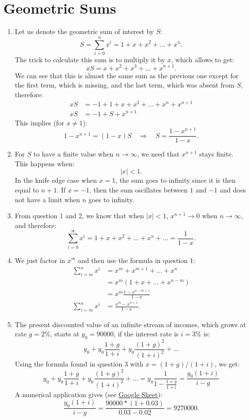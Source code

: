 \documentclass[]{book}
\theoremstyle{definition}
\theoremstyle{definition}
\theoremstyle{definition}
\theoremstyle{remark}
\begin{document}
\section*{Geometric Sums}\label{geometric-sums-1}

\begin{enumerate}
\def\labelenumi{\arabic{enumi}.}
\item
  Let us denote the geometric sum of interest by \(S\):
  \[S=\sum_{i=0}^n x^i = 1+x+x^2+...+x^n.\] The trick to calculate this
  sum is to multiply it by \(x\), which allows to get:
  \[xS=x+x^2+x^3+...+x^{n+1}.\] We can see that this is almost the same
  sum as the previous one except for the first term, which is missing,
  and the last term, which was absent from \(S\), therefore:
  \[\begin{aligned}
  xS&=-1+1+x+x^2+...+x^n+x^{n+1}\\
  xS&=-1+S+x^{n+1}
  \end{aligned}\] This implies (for \(x\neq1\)):
  \[1-x^{n+1}=(1-x)S \quad \Rightarrow \quad S=\frac{1-x^{n+1}}{1-x}.\]
\item
  For \(S\) to have a finite value when \(n \to \infty\), we need that
  \(x^{n+1}\) stays finite. This happens when: \[\lvert x\rvert<1.\] In
  the knife edge case when \(x=1\), the sum goes to infinity since it is
  then equal to \(n+1\). If \(x=-1\), then the sum oscillates between
  \(1\) and \(-1\) and does not have a limit when \(n\) goes to
  infinity.
\item
  From question 1 and 2, we know that when \(\lvert x\rvert<1\),
  \(x^{n+1} \to 0\) when \(n \to \infty\), and therefore:
  \[\sum_{i=0}^{\infty} x^i = 1+x+x^2+...+x^n+...=\frac{1}{1-x}.\]
\item
  We just factor in \(x^m\) and then use the formula in question 1:
  \[\begin{aligned}
  \sum_{i=m}^n x^i &= x^m+x^{m+1}+...+x^n\\
  &=x^m\left(1+x+...+x^{n-m}\right)\\
  &=x^m\frac{1-x^{n-m+1}}{1-x}\\
  \sum_{i=m}^n x^i &=\frac{x^m - x^{n+1}}{1-x}.
  \end{aligned}\]
\item
  The present discounted value of an infinite stream of incomes, which
  grows at rate \(g=2\)\%, starts at \(y_0=90000\), if the interest rate
  is \(i=3\)\% is:
  \[y_0+y_0\frac{1+g}{1+i}+y_0\frac{(1+g)^2}{(1+i)^2} + ...\] Using the
  formula found in question 3 with \(x=(1+g)/(1+i)\), we get:
  \[y_0+y_0\frac{1+g}{1+i}+y_0\frac{(1+g)^2}{(1+i)^2} + ...=y_0\dfrac{1}{1-\frac{1+g}{1+i}}=\frac{y_0(1+i)}{i-g}\]
  A numerical application gives (see
  \href{https://docs.google.com/spreadsheets/d/108I8xuosIQvgU6wOGrfwzHhE4p1OStgv8iIpzZ-4vME/edit?usp=sharing}{Google
  Sheet}):
  \[\frac{y_0(1+i)}{i-g}=\frac{90000 *(1+0.03)}{0.03-0.02}=9270000.\]
\end{enumerate}
\end{document}
